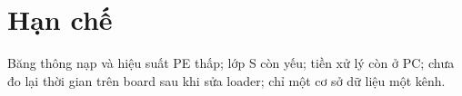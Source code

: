 \section{Hạn chế}\label{sec:hanche}
\begin{goiy}
  Băng thông nạp và hiệu suất PE thấp; lớp S còn yếu; tiền xử lý còn ở PC; chưa đo lại thời gian trên board sau khi sửa loader; chỉ một cơ sở dữ liệu một kênh.
\end{goiy}
